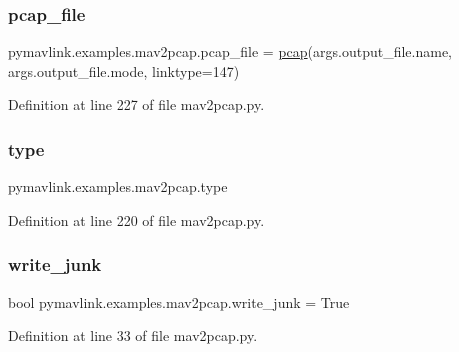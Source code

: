 \subsubsection{\texorpdfstring{pcap\_file}{pcap\_file}}
{\footnotesize\ttfamily pymavlink.\+examples.\+mav2pcap.\+pcap\+\_\+file = \mbox{\hyperlink{classpymavlink_1_1examples_1_1mav2pcap_1_1pcap}{pcap}}(args.\+output\+\_\+file.\+name, args.\+output\+\_\+file.\+mode, linktype=147)}



Definition at line 227 of file mav2pcap.\+py.

\mbox{\label{namespacepymavlink_1_1examples_1_1mav2pcap_a4dcd0e188fafa9a646770bdce8970759}} 
\subsubsection{\texorpdfstring{type}{type}}
{\footnotesize\ttfamily pymavlink.\+examples.\+mav2pcap.\+type}



Definition at line 220 of file mav2pcap.\+py.

\mbox{\label{namespacepymavlink_1_1examples_1_1mav2pcap_a282a364e273b18682a5a5da5fb645b89}} 
\subsubsection{\texorpdfstring{write\_junk}{write\_junk}}
{\footnotesize\ttfamily bool pymavlink.\+examples.\+mav2pcap.\+write\+\_\+junk = True}



Definition at line 33 of file mav2pcap.\+py.

